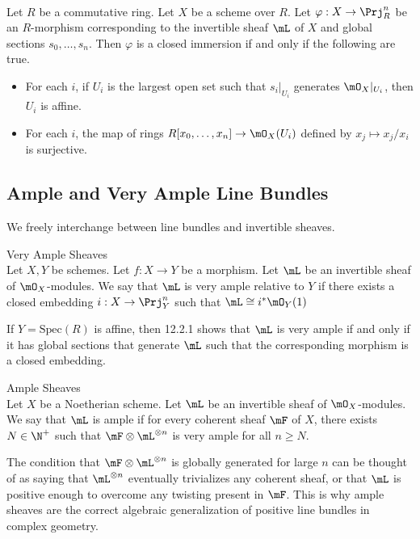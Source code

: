 \documentclass[a4paper]{article}
\begin{document}
\begin{prp}{}{}\\
Let $R$ be a commutative ring. Let $X$ be a scheme over $R$. Let $\varphi:X\to\Prj_R^n$ be an $R$-morphism corresponding to the invertible sheaf $\mL$ of $X$ and global sections $s_0,\dots,s_n$. Then $\varphi$ is a closed immersion if and only if the following are true. 
\begin{itemize}
\item For each $i$, if $U_i$ is the largest open set such that $s_i|_{U_i}$ generates $\mO_X|_{U_i}$, then $U_i$ is affine. 
\item For each $i$, the map of rings $R[x_0,\dots,x_n]\to\mO_X(U_i)$ defined by $x_j\mapsto x_j/x_i$ is surjective. 
\end{itemize}
\end{prp}

\subsection{Ample and Very Ample Line Bundles}
We freely interchange between line bundles and invertible sheaves. 

\begin{defn}{Very Ample Sheaves}{}\\
Let $X,Y$ be schemes. Let $f:X\to Y$ be a morphism. Let $\mL$ be an invertible sheaf of $\mO_X$-modules. We say that $\mL$ is very ample relative to $Y$ if there exists a closed embedding $i:X\to\Prj_Y^n$ such that $\mL\cong i^\ast\mO_Y(1)$
\end{defn}

If $Y=\text{Spec}(R)$ is affine, then 12.2.1 shows that $\mL$ is very ample if and only if it has global sections that generate $\mL$ such that the corresponding morphism is a closed embedding. 

\begin{defn}{Ample Sheaves}{}\\
Let $X$ be a Noetherian scheme. Let $\mL$ be an invertible sheaf of $\mO_X$-modules. We say that $\mL$ is ample if for every coherent sheaf $\mF$ of $X$, there exists $N\in\N^+$ such that $\mF\otimes\mL^{\otimes n}$ is very ample for all $n\geq N$. 
\end{defn}

The condition that $\mF\otimes\mL^{\otimes n}$ is globally generated for large $n$ can be thought of as saying that $\mL^{\otimes n}$ eventually trivializes any coherent sheaf, or that $\mL$ is positive enough to overcome any twisting present in $\mF$. This is why ample sheaves are the correct algebraic generalization of positive line bundles in complex geometry. 
\end{document}
